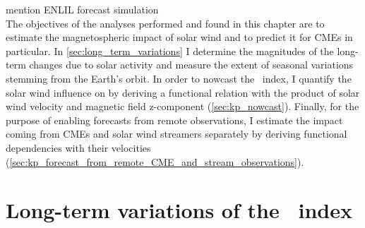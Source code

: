 mention ENLIL forecast simulation\\

The objectives of the analyses performed and found in this chapter are to estimate the magnetospheric impact of solar wind and to predict it for CMEs in particular. In \autoref{sec:long_term_variations} I determine the magnitudes of the long-term \Kp{} changes due to solar activity and measure the extent of seasonal variations stemming from the Earth's orbit. In order to nowcast the \Kp{}~index, I quantify the solar wind influence on \Kp{} by deriving a functional relation with the product of solar wind velocity and magnetic field z-component (\autoref{sec:kp_nowcast}). Finally, for the purpose of enabling \Kp{} forecasts from remote observations, I estimate the \Kp{} impact coming from CMEs and solar wind streamers separately by deriving functional dependencies with their velocities (\autoref{sec:kp_forecast_from_remote_CME_and_stream_observations}).


\section{Long-term variations of the \Kp{}~index}
\label{sec:long_term_variations}

